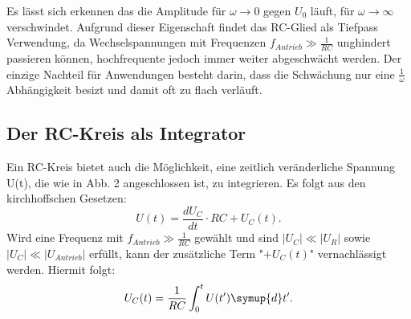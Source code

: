Es lässt sich erkennen das die Amplitude für $\omega \to 0$ gegen $U_0$ läuft, für
$\omega \to \infty$ verschwindet. Aufgrund dieser Eigenschaft findet das RC-Glied als
 Tiefpass Verwendung, da Wechselspannungen mit Frequenzen $f_{Antrieb} \gg \frac{1}{RC}$
  unghindert passieren können, hochfrequente jedoch immer weiter abgeschwächt werden.
  Der einzige Nachteil für Anwendungen besteht darin, dass die Schwächung nur eine $\frac{1}{\omega}$ Abhängigkeit besizt und damit oft zu flach verläuft.

\subsection{Der RC-Kreis als Integrator}

Ein RC-Kreis bietet auch die Möglichkeit, eine zeitlich veränderliche Spannung U(t), die
wie in Abb. 2 angeschlossen ist, zu integrieren. Es folgt aus den kirchhoffschen Gesetzen:
\begin{equation}
  U(t) = \frac{dU_C}{dt}\cdot RC+U_C(t)\text{.}
\end{equation}
Wird eine Frequenz mit $f_{Antrieb} \gg \frac{1}{RC}$ gewählt und sind
$|U_C| \ll |U_R|$ sowie $|U_C| \ll |U_{Antrieb}|$ erfüllt, kann der zusätzliche Term "$+ U_C(t)$"
 vernachlässigt werden. Hiermit folgt:
\begin{equation}
U_C(t) = \frac{1}{RC}\int_{0}^{t} U(t') \symup{d}t'\text{.}
\end{equation}
